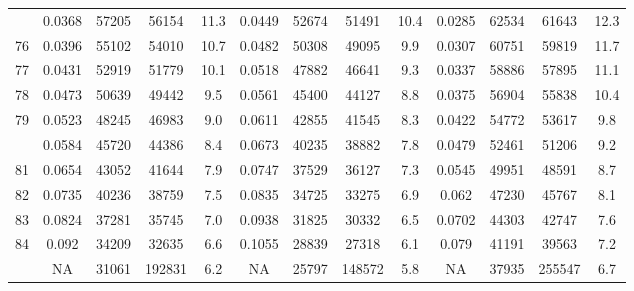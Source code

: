 \documentclass[
  14pt,
]{article}
\begin{document}
\begin{longtable}[t]{lcccccccccccc}
\addlinespace
75 & 0.0368 & 57205 & 56154 & 11.3 & 0.0449 & 52674 & 51491 & 10.4 & 0.0285 & 62534 & 61643 & 12.3\\
76 & 0.0396 & 55102 & 54010 & 10.7 & 0.0482 & 50308 & 49095 & 9.9 & 0.0307 & 60751 & 59819 & 11.7\\
77 & 0.0431 & 52919 & 51779 & 10.1 & 0.0518 & 47882 & 46641 & 9.3 & 0.0337 & 58886 & 57895 & 11.1\\
78 & 0.0473 & 50639 & 49442 & 9.5 & 0.0561 & 45400 & 44127 & 8.8 & 0.0375 & 56904 & 55838 & 10.4\\
79 & 0.0523 & 48245 & 46983 & 9.0 & 0.0611 & 42855 & 41545 & 8.3 & 0.0422 & 54772 & 53617 & 9.8\\
\addlinespace
80 & 0.0584 & 45720 & 44386 & 8.4 & 0.0673 & 40235 & 38882 & 7.8 & 0.0479 & 52461 & 51206 & 9.2\\
81 & 0.0654 & 43052 & 41644 & 7.9 & 0.0747 & 37529 & 36127 & 7.3 & 0.0545 & 49951 & 48591 & 8.7\\
82 & 0.0735 & 40236 & 38759 & 7.5 & 0.0835 & 34725 & 33275 & 6.9 & 0.062 & 47230 & 45767 & 8.1\\
83 & 0.0824 & 37281 & 35745 & 7.0 & 0.0938 & 31825 & 30332 & 6.5 & 0.0702 & 44303 & 42747 & 7.6\\
84 & 0.092 & 34209 & 32635 & 6.6 & 0.1055 & 28839 & 27318 & 6.1 & 0.079 & 41191 & 39563 & 7.2\\
\addlinespace
85 & NA & 31061 & 192831 & 6.2 & NA & 25797 & 148572 & 5.8 & NA & 37935 & 255547 & 6.7\\*
\end{longtable}
\end{document}
